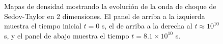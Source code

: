 \documentclass[12pt,a4paper]{book}
\begin{document}
\begin{figure}
    \caption{Mapas de densidad mostrando la evolución de la onda de choque de Sedov-Taylor en 2 dimensiones. El panel de arriba a la izquierda muestra el tiempo inicial $t=0$ s, el de arriba a la derecha al 
    $t \approx 10^{10}$ s, y el panel de abajo muestra el tiempo $t = 8.1 \times 10^{10}$ s.
    \label{fig:prueba_2d_newtoniana}}
\end{figure}
\end{document}
